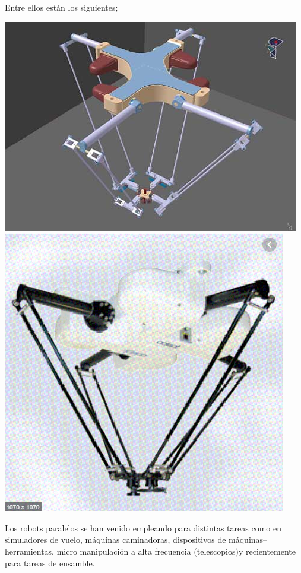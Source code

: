 \documentclass[11pt,a4paper,oldfontcommands,oneside]{memoir}
\begin{document}
Entre ellos están los siguientes; \\
\begin{center}
\includegraphics[scale=1.15]{1.png} \\
\includegraphics[scale=1]{2.PNG}\\
\end{center}


Los robots paralelos se han venido empleando para distintas tareas como en simuladores de vuelo, máquinas caminadoras, dispositivos de máquinas–herramientas, micro manipulación a alta frecuencia (telescopios)y recientemente para tareas de ensamble. \\
\end{document}
